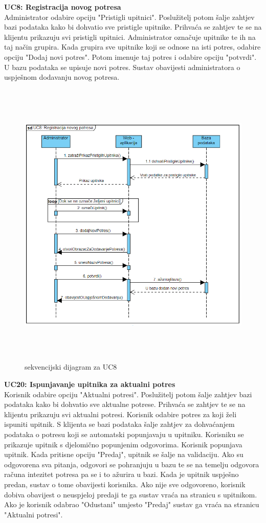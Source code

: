 			\textbf{UC8: Registracija novog potresa}\\
			{Administrator odabire opciju "Pristigli upitnici". Poslužitelj potom šalje zahtjev bazi podataka kako bi dohvatio sve pristigle upitnike. Prihvaća se zahtjev te se na klijentu prikazuju svi pristigli upitnici. Administrator označuje upitnike te ih na taj način grupira. Kada grupira sve upitnike koji se odnose na isti potres, odabire opciju "Dodaj novi potres". Potom imenuje taj potres i odabire opciju "potvrdi". U bazu podataka se upisuje novi potres. Sustav obavijesti administratora o uspješnom dodavanju novog potresa.}
			\begin{figure}[H]
				  \includegraphics[width=\textwidth, height=14cm]{slike/uc8.PNG}
				  \caption{sekvencijski dijagram za UC8}
				  \label{fig:sekvuc4} 
				 \end{figure}
			\textbf{UC20: Ispunjavanje upitnika za aktualni potres}\\
			{Korisnik odabire opciju "Aktualni potresi". Poslužitelj potom šalje zahtjev bazi podataka kako bi dohvatio sve aktualne potrese. Prihvaća se zahtjev te se na klijentu prikazuju svi aktualni potresi. Korisnik odabire potres za koji želi ispuniti upitnik. S klijenta se bazi podataka šalje zahtjev za dohvaćanjem podataka o potresu koji se automatski popunjavaju u upitniku. Korisniku se prikazuje upitnik s djelomično popunjenim odgovorima. Korisnik popunjava upitnik. Kada pritisne opciju "Predaj", upitnik se šalje na validaciju. Ako su odgovorena sva pitanja, odgovori se pohranjuju u bazu te se na temelju odgovora računa intezitet potresa pa se i to ažurira u bazi. 
			Kada je upitnik uspješno predan, sustav o tome obavijesti korisnika. Ako nije sve odgovoreno, korisnik dobiva obavijest o neuspjeloj predaji te ga sustav vraća na stranicu s upitnikom. Ako je korisnik odabrao "Odustani" umjesto "Predaj" sustav ga vraća na stranicu "Aktualni potresi".}
